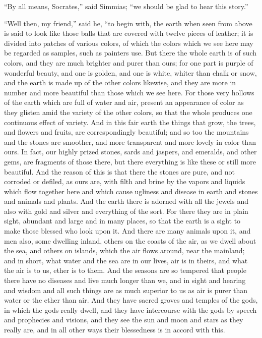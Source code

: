 \documentclass[letterpaper,12pt]{article}
\newcommand{\stephpag}[1]{\marginnote{\small\itshape\fontfamily{ppl}\selectfont #1}}
\begin{document}
\begin{drama}
``By all means, Socrates,'' said Simmias; ``we should be glad to hear this story.''
 
``Well then, my friend,'' said he, ``to begin with, the earth when seen from above is said to look like those balls that are covered with twelve pieces of leather; it is divided into patches of various colors, of which the colors which we see here may be regarded as samples, such as painters use. \stephpag{c} But there the whole earth is of such colors, and they are much brighter and purer than ours; for one part is purple of wonderful beauty, and one is golden, and one is white, whiter than chalk or snow, and the earth is made up of the other colors likewise, and they are more in number and more beautiful than those which we see here. For those very hollows of the earth which are full of water and air, present an appearance \stephpag{d} of color as they glisten amid the variety of the other colors, so that the whole produces one continuous effect of variety. And in this fair earth the things that grow, the trees, and flowers and fruits, are correspondingly beautiful; and so too the mountains and the stones are smoother, and more transparent and more lovely in color than ours. In fact, our highly prized stones, sards and \stephpag{e} jaspers, and emeralds, and other gems, are fragments of those there, but there everything is like these or still more beautiful. And the reason of this is that there the stones are pure, and not corroded or defiled, as ours are, with filth and brine by the vapors and liquids which flow together here and which cause ugliness and disease in earth and stones and animals and plants. And the earth there is adorned with all the jewels and also with gold and \stephpag{111 a} silver and everything of the sort. For there they are in plain sight, abundant and large and in many places, so that the earth is a sight to make those blessed who look upon it. And there are many animals upon it, and men also, some dwelling inland, others on the coasts of the air, as we dwell about the sea, and others on islands, which the air flows around, near the mainland; and in short, what water and the sea are \stephpag{b} in our lives, air is in theirs, and what the air is to us, ether is to them. And the seasons are so tempered that people there have no diseases and live much longer than we, and in sight and hearing and wisdom and all such things are as much superior to us as air is purer than water or the ether than air. And they have sacred groves and temples of the gods, in which the gods really dwell, and they have intercourse with the gods by speech and prophecies and visions, \stephpag{c} and they see the sun and moon and stars as they really are, and in all other ways their blessedness is in accord with this.
 

\end{drama}
\end{document}
